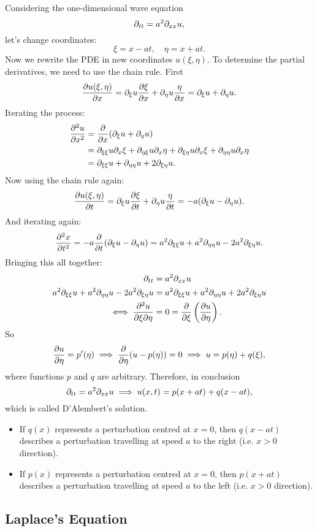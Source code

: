 Considering the one-dimensional wave equation
\[
	\partial_{tt} = a^2\partial_{xx}u,
\]
let's change coordinates:
\[
	\xi = x - at, \quad \eta = x + at.
\]
Now we rewrite the PDE in new coordinates $u(\xi, \eta)$. To determine the partial derivatives, we need to use the chain rule. First
\[
	\frac{\partial u(\xi, \eta)}{\partial x} = \partial_{\xi}u\frac{\partial\xi}{\partial x} + \partial_{\eta}u\frac{\eta}{\partial x} = \partial_{\xi}u + \partial_{\eta}u.
\]
Iterating the process:
\begin{align*}
	\frac{\partial^2u}{\partial x^2} &= \frac{\partial}{\partial x}(\partial_{\xi}u + \partial_{\eta}u) \\
	&= \partial_{\xi\xi}u \partial_x\xi + \partial_{\eta\xi}u \partial_x\eta + \partial_{\xi\eta}u \partial_x\xi + \partial_{\eta\eta}u \partial_x\eta \\
	&= \partial_{\xi\xi}u + \partial_{\eta\eta}u + 2\partial_{\xi\eta}u.
\end{align*}
Now using the chain rule again:
\[
	\frac{\partial u(\xi, \eta)}{\partial t} = \partial_{\xi}u\frac{\partial\xi}{\partial t} + \partial_{\eta}u\frac{\eta}{\partial t} = -a(\partial_{\xi}u - \partial_{\eta}u).
\]
And iterating again:
\[
	\frac{\partial^2x}{\partial t^2} = -a\frac{\partial}{\partial t} (\partial_{\xi}u - \partial_{\eta}u) = a^2\partial_{\xi\xi}u + a^2\partial_{\eta\eta}u - 2a^2\partial_{\xi\eta}u.
\]
Bringing this all together:
\begin{align*}
	\partial_{tt} &= a^2\partial_{xx}u \\
	a^2\partial_{\xi\xi}u + a^2\partial_{\eta\eta}u - 2a^2\partial_{\xi\eta}u &= a^2\partial_{\xi\xi}u + a^2\partial_{\eta\eta}u + 2a^2\partial_{\xi\eta}u \\
	\iff \frac{\partial^2u}{\partial\xi\partial\eta} &= 0 = \frac{\partial}{\partial\xi}\left(\frac{\partial u}{\partial\eta}\right).
\end{align*}
So
\[
	\frac{\partial u}{\partial\eta} = p'(\eta) \implies \frac{\partial}{\partial\eta}(u - p(\eta)) = 0 \implies u = p(\eta) + q(\xi),
\]
where functions $p$ and $q$ are arbitrary. Therefore, in conclusion
\[
	\partial_{tt} = a^2\partial_{xx}u \implies u(x,t) = p(x+at) + q(x-at),
\]
which is called D'Alembert's solution.
\begin{itemize}
	\item If $q(x)$ represents a perturbation centred at $x=0$, then $q(x-at)$ describes a perturbation travelling at speed $a$ to the right (i.e. $x>0$ direction).
	\item If $p(x)$ represents a perturbation centred at $x=0$, then $p(x+at)$ describes a perturbation travelling at speed $a$ to the left (i.e. $x>0$ direction).
\end{itemize}


\subsection{Laplace's Equation}

